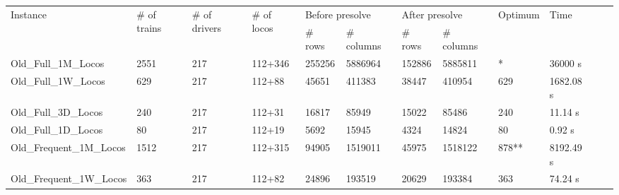 	\begin{landscape}
		\begin{table}[h]
			\begin{tabular}{@{}llllllllllll@{}}
				\toprule
				\multirow{2}{*}{Instance}           & \multirow{2}{*}{\# of trains} & \multirow{2}{*}{\# of drivers} & \multirow{2}{*}{\# of locos} & \multicolumn{2}{l}{Before presolve} & \multicolumn{2}{l}{After presolve} & \multirow{2}{*}{Optimum} & \multirow{2}{*}{Time} \\ \cmidrule(lr){5-8}
				&                               &                              &                                & \# rows  & \# columns  & \# rows & \# columns  &                          &                                  \\ \midrule
				Old\_Full\_1M\_Locos    			& 2551                          & 217                          & 112+346                              & \num{255256}        & \num{5886964}                  & \num{152886}       & \num{5885811}                   & *                       &    \num{36000} s                             \\ \hline
				Old\_Full\_1W\_Locos    			& 629                          & 217                          & 112+88                              & \num{45651}        & \num{411383}                  & \num{38447}       & \num{410954}                   & 629                       &  1682.08 s                                \\ \hline
				Old\_Full\_3D\_Locos    			& 240                          & 217                          & 112+31                              & \num{16817}        & \num{85949}                  & \num{15022}       & \num{85486}                   & 240                     & 11.14 s                              \\ \hline
				Old\_Full\_1D\_Locos    			& 80                          & 217                          & 112+19                             & \num{5692}        & \num{15945}                  & \num{4324}       & \num{14824}                   & 80                     & 0.92 s                             \\ \hline
				Old\_Frequent\_1M\_Locos   & 1512                          & 217                          & 112+315                              &  \num{94905}       & \num{1519011}                  & \num{45975}       & \num{1518122}                  & 878**                       & 8192.49 s                                \\	\hline		 
				Old\_Frequent\_1W\_Locos   & 363                          & 217                          & 112+82                              & \num{24896}        & \num{193519}                  & \num{20629}       & \num{193384}                   & 363                        & 74.24 s                         \\	\hline			

\end{tabular}
\end{table}
\end{landscape}
